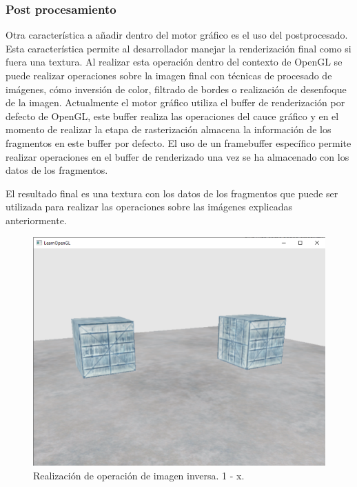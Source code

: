 \documentclass[a4paper, 17pt]{book}
\begin{document}
\subsubsection{Post procesamiento}

Otra característica a añadir dentro del motor gráfico es el uso del postprocesado. Esta característica permite
al desarrollador manejar la renderización final como si fuera una textura. Al realizar esta operación dentro del
contexto de OpenGL se puede realizar operaciones sobre la imagen final con técnicas de procesado de imágenes, cómo
inversión de color, filtrado de bordes o realización de desenfoque de la imagen. Actualmente el motor gráfico utiliza
el buffer de renderización por defecto de OpenGL, este buffer realiza las operaciones del cauce gráfico y en el
momento de realizar la etapa de rasterización almacena la información de los fragmentos en este buffer por defecto.
El uso de un framebuffer específico permite realizar operaciones en el buffer de renderizado una vez se ha almacenado
con los datos de los fragmentos.

\vspace{1mm} %

El resultado final es una textura con los datos de los fragmentos que puede ser utilizada para realizar las operaciones
sobre las imágenes explicadas anteriormente.

\begin{figure}[H]
    \centering
    \includegraphics[scale=0.35, keepaspectratio]{img/framebuffers_inverse.png}
    \caption{Realización de operación de imagen inversa. 1 - x.}
    \label{figura:materialesBlender}
\end{figure}
\end{document}

